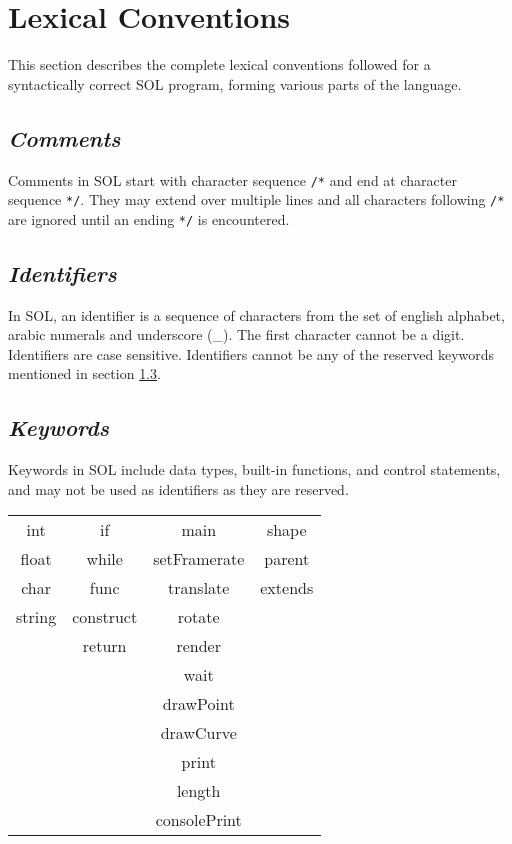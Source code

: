\documentclass[letterpaper,12pt]{article}
\begin{document}
\section{Lexical Conventions}

This section describes the complete lexical conventions followed for a syntactically correct SOL program, forming various parts of the language.

    \subsection{\textit{Comments}}
    Comments in SOL start with character sequence \texttt{/*} and end at character sequence \texttt{*/}. They may extend over multiple lines and all characters following \texttt{/*} are ignored until an ending \texttt{*/} is encountered.

    \subsection{\textit{Identifiers}}
    In SOL, an identifier is a sequence of characters from the set of english alphabet, arabic numerals and underscore (\_). The first character cannot be a digit. Identifiers are case sensitive. Identifiers cannot be any of the reserved keywords mentioned in section \ref{keywords}.

    \subsection{\textit{Keywords}} \label{keywords}
    Keywords in SOL include data types, built-in functions, and control statements, and may not be used as identifiers as they are reserved.

        \begin{center}
            \begin{tabular}{ |c|c|c|c| } 
            \hline
                int     & if            & main          & shape \\ 
                float   & while         & setFramerate  & parent\\ 
                char    & func          & translate     & extends\\
                string  & construct     & rotate        & \\
                        & return        & render        & \\
                        &               & wait          & \\
                        &               & drawPoint     & \\
                        &               & drawCurve     & \\
                        &               & print         & \\
                        &               & length        & \\
                        &               & consolePrint  & \\
            \hline
            \end{tabular}
        \end{center}
\end{document}
